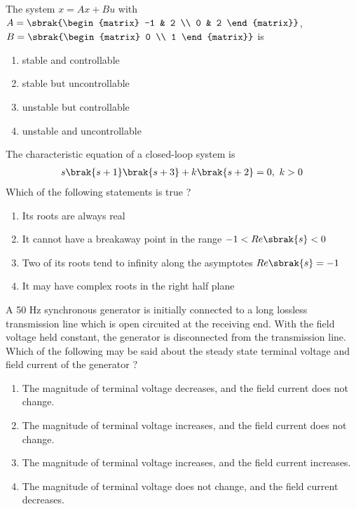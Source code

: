 \item The system $x = Ax + Bu$ with $A = \sbrak{\begin{matrix}
    -1 & 2 \\ 0 & 2
\end{matrix}}$, $B = \sbrak{\begin{matrix}
    0 \\ 1
\end{matrix}}$ is
\begin{enumerate}
    \item stable and controllable
    \item stable but uncontrollable
    \item unstable but controllable
    \item unstable and uncontrollable \\
\end{enumerate}
\item The characteristic equation of a closed-loop system is 
\begin{align*}
    s\brak{s+1}\brak{s+3} + k\brak{s+2} = 0,\ k > 0
\end{align*}
Which of the following statements is true ? 
 \begin{enumerate}
    \item Its roots are always real
    \item It cannot have a breakaway point in the range $-1 < Re\sbrak{s} < 0$
    \item Two of its roots tend to infinity along the asymptotes $Re\sbrak{s} = -1$
    \item It may have complex roots in the right half plane \\
\end{enumerate}
\item A 50 Hz synchronous generator is initially connected to a long lossless
transmission line which is open circuited at the receiving end. With the field voltage held constant, the generator is disconnected from the transmission line. Which of the following may be said about the steady state terminal voltage and field current of the generator ? 
\begin{figure}[!ht]
\centering
\resizebox{0.5\textwidth}{!}{%

}%
\end{figure}
\begin{enumerate}
    \item The magnitude of terminal voltage decreases, and the field current does not change.
    \item The magnitude of terminal voltage increases, and the field current does not change.
    \item The magnitude of terminal voltage increases, and the field current increases.
    \item The magnitude of terminal voltage does not change, and the field current decreases. \\
\end{enumerate}
